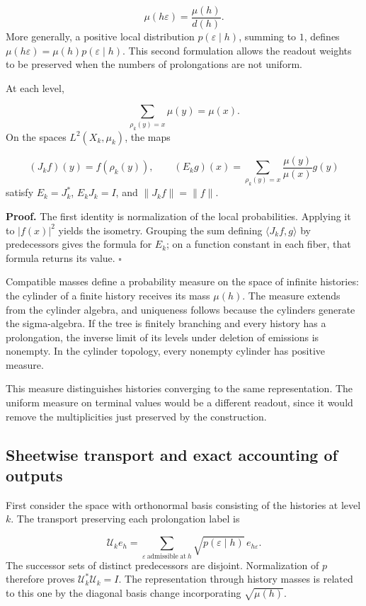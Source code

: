 \[
\mu(h\varepsilon)=\frac{\mu(h)}{d(h)}.
\]
More generally, a positive local distribution \(p(\varepsilon\mid h)\), summing to \(1\), defines \(\mu(h\varepsilon)=\mu(h)p(\varepsilon\mid h)\). This second formulation allows the readout weights to be preserved when the numbers of prolongations are not uniform.

At each level,

\[
\sum_{\rho_k(y)=x}\mu(y)=\mu(x).
\]
On the spaces \(L^2(X_k,\mu_k)\), the maps

\[
(J_kf)(y)=f(\rho_k(y)),
\qquad
(E_kg)(x)=\sum_{\rho_k(y)=x}\frac{\mu(y)}{\mu(x)}g(y)
\]
satisfy \(E_k=J_k^*\), \(E_kJ_k=I\), and \(\|J_kf\|=\|f\|\).

\textbf{Proof.} The first identity is normalization of the local probabilities. Applying it to \(|f(x)|^2\) yields the isometry. Grouping the sum defining \(\langle J_kf,g\rangle\) by predecessors gives the formula for \(E_k\); on a function constant in each fiber, that formula returns its value. \hfill\(\square\)

Compatible masses define a probability measure on the space of infinite histories: the cylinder of a finite history receives its mass \(\mu(h)\). The measure extends from the cylinder algebra, and uniqueness follows because the cylinders generate the sigma-algebra. If the tree is finitely branching and every history has a prolongation, the inverse limit of its levels under deletion of emissions is nonempty. In the cylinder topology, every nonempty cylinder has positive measure.

This measure distinguishes histories converging to the same representation. The uniform measure on terminal values would be a different readout, since it would remove the multiplicities just preserved by the construction.

\subsection{Sheetwise transport and exact accounting of outputs}
First consider the space with orthonormal basis consisting of the histories at level \(k\). The transport preserving each prolongation label is

\[
\mathcal U_ke_h=
\sum_{\varepsilon\ \mathrm{admissible\ at}\ h}
\sqrt{p(\varepsilon\mid h)}\,e_{h\varepsilon}.
\]
The successor sets of distinct predecessors are disjoint. Normalization of \(p\) therefore proves \(\mathcal U_k^*\mathcal U_k=I\). The representation through history masses is related to this one by the diagonal basis change incorporating \(\sqrt{\mu(h)}\).

